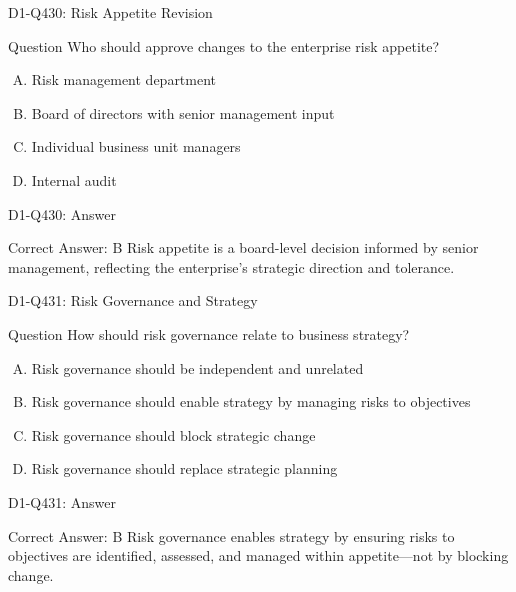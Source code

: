\documentclass{beamer}
\begin{document}
\begin{frame}{D1-Q430: Risk Appetite Revision}
	\begin{block}{Question}
		Who should approve changes to the enterprise risk appetite?
	\end{block}
	\begin{enumerate}[(A)]
		\item Risk management department
		\item Board of directors with senior management input
		\item Individual business unit managers
		\item Internal audit
	\end{enumerate}
\end{frame}
\begin{frame}{D1-Q430: Answer}
	\begin{block}{Correct Answer: B}
		Risk appetite is a board-level decision informed by senior management, reflecting the enterprise's strategic direction and tolerance.
	\end{block}
\end{frame}

\begin{frame}{D1-Q431: Risk Governance and Strategy}
	\begin{block}{Question}
		How should risk governance relate to business strategy?
	\end{block}
	\begin{enumerate}[(A)]
		\item Risk governance should be independent and unrelated
		\item Risk governance should enable strategy by managing risks to objectives
		\item Risk governance should block strategic change
		\item Risk governance should replace strategic planning
	\end{enumerate}
\end{frame}
\begin{frame}{D1-Q431: Answer}
	\begin{block}{Correct Answer: B}
		Risk governance enables strategy by ensuring risks to objectives are identified, assessed, and managed within appetite—not by blocking change.
	\end{block}
\end{frame}
\end{document}
